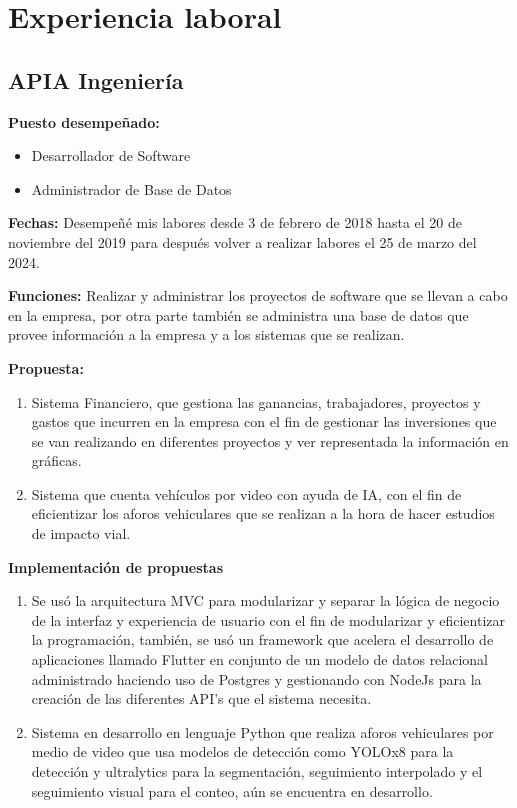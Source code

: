 \documentclass[protocolo.tex]{subfiles}
\begin{document}
\vfill %
\section{Experiencia laboral}

\subsection{APIA Ingeniería}

\textbf{Puesto desempeñado:} 
\begin{itemize}
\item Desarrollador de Software
\item Administrador de Base de Datos
\end{itemize}

\textbf{Fechas:}
Desempeñé mis labores desde 3 de febrero de 2018 hasta el 20 de noviembre del 2019 para después volver a realizar labores el 25 de marzo del 2024.

\textbf{Funciones:}
Realizar y administrar los proyectos de software que se llevan a cabo en la empresa, por otra parte también se administra una base de datos que provee información a la empresa y a los sistemas que se realizan.

\textbf{Propuesta:}
\begin{enumerate}
\item Sistema Financiero, que gestiona las ganancias, trabajadores, proyectos y gastos que incurren en la empresa con el fin de gestionar las inversiones que se van realizando en diferentes proyectos y ver representada la información en gráficas.
\item Sistema que cuenta vehículos por video con ayuda de IA, con el fin de eficientizar los aforos vehiculares que se realizan a la hora de hacer estudios de impacto vial.
\end{enumerate}

\textbf{Implementación de propuestas}
\begin{enumerate}
\item Se usó la arquitectura MVC para modularizar y separar la lógica de negocio de la interfaz y experiencia de usuario con el fin de modularizar y eficientizar la programación, también, se usó un framework que acelera el desarrollo de aplicaciones llamado Flutter en conjunto de un modelo de datos relacional administrado haciendo uso de Postgres y gestionando con NodeJs para la creación de las diferentes API’s que el sistema necesita.
\item Sistema en desarrollo en lenguaje Python que realiza aforos vehiculares por medio de video que usa modelos de detección como YOLOx8 para la detección y ultralytics para la segmentación, seguimiento interpolado y el seguimiento visual para el conteo, aún se encuentra en desarrollo.
\end{enumerate}
\end{document}
